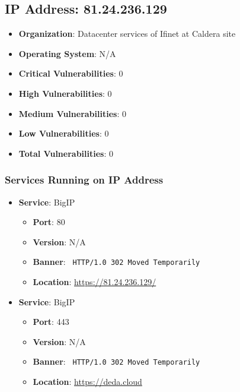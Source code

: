 \documentclass{article}
\begin{document}
\clearpage



\subsection*{IP Address: 81.24.236.129}

\begin{itemize}
    \item \textbf{Organization}: Datacenter services of Ifinet at Caldera site
    \item \textbf{Operating System}:  N/A 
    \item \textbf{Critical Vulnerabilities}: 0
    \item \textbf{High Vulnerabilities}: 0
    \item \textbf{Medium Vulnerabilities}: 0
    \item \textbf{Low Vulnerabilities}: 0
    \item \textbf{Total Vulnerabilities}: 0
\end{itemize}

\subsubsection*{Services Running on IP Address}

\begin{itemize}
    
        \item \textbf{Service}: BigIP
        \begin{itemize}
            \item \textbf{Port}: 80
            \item \textbf{Version}:  N/A 
            \item \textbf{Banner}: \texttt{
                HTTP/1.0 302 Moved Temporarily
            }
            \item \textbf{Location}: \href{ https://81.24.236.129/ }{ https://81.24.236.129/ }
        \end{itemize}
    
        \item \textbf{Service}: BigIP
        \begin{itemize}
            \item \textbf{Port}: 443
            \item \textbf{Version}:  N/A 
            \item \textbf{Banner}: \texttt{
                HTTP/1.0 302 Moved Temporarily
            }
            \item \textbf{Location}: \href{ https://deda.cloud }{ https://deda.cloud }
        \end{itemize}
    
\end{itemize}
\end{document}
